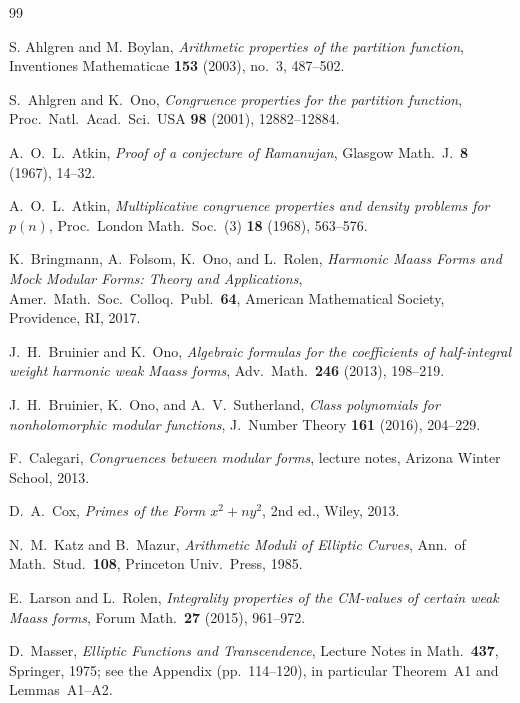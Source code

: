 \documentclass[12pt]{amsart}
\theoremstyle{definition}
\theoremstyle{remark}
\begin{document}
\begin{thebibliography}{99}

S. Ahlgren and M. Boylan,
\emph{Arithmetic properties of the partition function},
Inventiones Mathematicae \textbf{153} (2003), no.~3, 487--502.



S.~Ahlgren and K.~Ono,
\emph{Congruence properties for the partition function},
Proc.\ Natl.\ Acad.\ Sci.\ USA \textbf{98} (2001), 12882--12884.




 A.~O.~L.~Atkin, \emph{Proof of a conjecture of Ramanujan}, Glasgow Math.\ J.\ \textbf{8} (1967), 14--32.

A.~O.~L.~Atkin,
\emph{Multiplicative congruence properties and density problems for $p(n)$},
Proc.\ London Math.\ Soc.\ (3) \textbf{18} (1968), 563--576.


 K.~Bringmann, A.~Folsom, K.~Ono, and L.~Rolen, \emph{Harmonic Maass Forms and Mock Modular Forms: Theory and Applications}, Amer.\ Math.\ Soc.\ Colloq.\ Publ.\ \textbf{64}, American Mathematical Society, Providence, RI, 2017.

 J.~H.~Bruinier and K.~Ono, \emph{Algebraic formulas for the coefficients of half-integral weight harmonic weak Maass forms}, Adv.\ Math.\ \textbf{246} (2013), 198--219.

 J.~H.~Bruinier, K.~Ono, and A.~V.~Sutherland, \emph{Class polynomials for nonholomorphic modular functions}, J.\ Number Theory \textbf{161} (2016), 204--229.

 F.~Calegari, \emph{Congruences between modular forms}, lecture notes, Arizona Winter School, 2013.

 D.~A.~Cox, \emph{Primes of the Form $x^2+ny^2$}, 2nd ed., Wiley, 2013.


 N.~M.~Katz and B.~Mazur, \emph{Arithmetic Moduli of Elliptic Curves}, Ann.\ of Math.\ Stud.\ \textbf{108}, Princeton Univ.\ Press, 1985.

 E.~Larson and L.~Rolen, \emph{Integrality properties of the CM-values of certain weak Maass forms}, Forum Math.\ \textbf{27} (2015), 961--972.

 D.~Masser, \emph{Elliptic Functions and Transcendence}, Lecture Notes in Math.\ \textbf{437}, Springer, 1975; see the Appendix (pp.~114--120), in particular Theorem~A1 and Lemmas~A1--A2.


\end{thebibliography}
\end{document}
